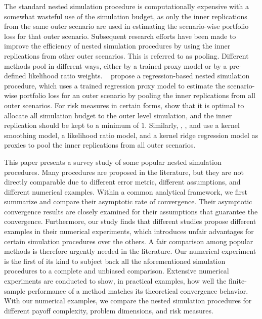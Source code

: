 \documentclass{article}
\begin{document}
The standard nested simulation procedure is computationally expensive with a somewhat wasteful use of the simulation budget, as only the inner replications from the same outer scenario are used in estimating the scenario-wise portfolio loss for that outer scenario. 
Subsequent research efforts have been made to improve the efficiency of nested simulation procedures by using the inner replications from other outer scenarios. 
This is referred to as pooling. 
Different methods pool in different ways, either by a trained proxy model or by a pre-defined likelihood ratio weights.
~\cite{broadie2015risk} propose a regression-based nested simulation procedure, which uses a trained regression proxy model to estimate the scenario-wise portfolio loss for an outer scenario by pooling the inner replications from all outer scenarios.
For risk measures in certain forms, \cite{broadie2015risk} show that it is optimal to allocate all simulation budget to the outer level simulation, and the inner replication should be kept to a minimum of $1$.
Similarly, \cite{hong2017kernel}, \cite{feng2020optimal}, and \cite{zhang2022sample} use a kernel smoothing model, a likelihood ratio model, and a kernel ridge regression model as proxies to pool the inner replications from all outer scenarios.

This paper presents a survey study of some popular nested simulation procedures. 
Many procedures are proposed in the literature, but they are not directly comparable due to different error metric, different assumptions, and different numerical examples.
Within a common analytical framework, we first summarize and compare their asymptotic rate of convergence.
Their asymptotic convergence results are closely examined for their assumptions that guarantee the convergence.
Furthermore, our study finds that different studies propose different examples in their numerical experiments, which introduces unfair advantages for certain simulation procedures over the others. 
A fair comparison among popular methods is therefore urgently needed in the literature. 
Our numerical experiment is the first of its kind to subject back all the aforementioned simulation procedures to a complete and unbiased comparison. 
Extensive numerical experiments are conducted to show, in practical examples, how well the finite-sample performance of a method matches its theoretical convergence behavior. 
With our numerical examples, we compare the nested simulation procedures for different payoff complexity, problem dimensions, and risk measures. 
\end{document}
